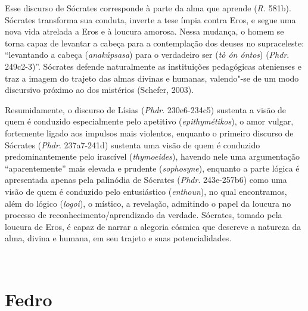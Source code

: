 Esse discurso de Sócrates corresponde à parte da alma que aprende
(\emph{R.} 581b). Sócrates transforma sua conduta, inverte a tese ímpia
contra Eros, e segue uma nova vida atrelada a Eros e à loucura amorosa.
Nessa mudança, o homem se torna capaz de levantar a cabeça para a
contemplação dos deuses no supraceleste: ``levantando a cabeça
(\emph{anakúpsasa}) para o verdadeiro ser (\emph{tò ón óntos})
(\emph{Phdr}. 249c2-3)''. Sócrates defende naturalmente as instituições
pedagógicas atenienses e traz a imagem do trajeto das almas divinas e
humanas, valendo"-se de um modo discursivo próximo ao dos mistérios
(Schefer, 2003).

 

\asterisc{}

 

Resumidamente, o discurso de Lísias (\emph{Phdr}. 230e6-234c5) sustenta
a visão de quem é conduzido especialmente pelo apetitivo
(\emph{epithymétikos}), o amor vulgar, fortemente ligado aos impulsos
mais violentos, enquanto o primeiro discurso de Sócrates
(\emph{Phdr}. 237a7-241d) sustenta uma visão de quem é conduzido
predominantemente pelo irascível (\emph{thymoeides}), havendo nele uma
argumentação ``aparentemente'' mais elevada e prudente
(\emph{sophosyne}), enquanto a parte lógica é apresentada apenas pela
palinódia de Sócrates (\emph{Phdr}. 243e-257b6) como uma visão de quem é
conduzido pelo entusiástico (\emph{enthoun}), no qual encontramos, além
do lógico (\emph{logoi}), o místico, a revelação, admitindo o papel da
loucura no processo de reconhecimento/\allowbreak{}aprendizado da verdade. Sócrates,
tomado pela loucura de Eros, é capaz de narrar a alegoria cósmica que
descreve a natureza da alma, divina e humana, em seu trajeto e suas
potencialidades.

 



​

\part{Fedro}

 
